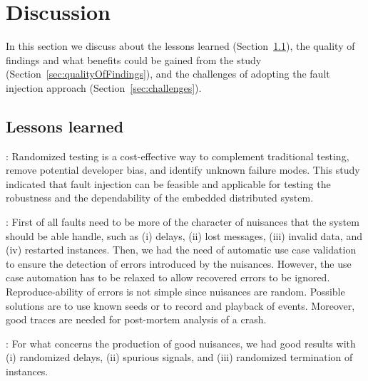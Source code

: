 \section{Discussion}\label{sec:discussion}

In this section we discuss about the %
lessons learned (Section~\ref{sec:lessonslearned}), the quality of findings and what benefits could be gained from the study (Section~\ref{sec:qualityOfFindings}), and the 
challenges of adopting the fault injection approach (Section~\ref{sec:challenges}). %

\subsection{Lessons learned}\label{sec:lessonslearned}

: Randomized testing is a cost-effective way to complement traditional testing, remove potential  developer bias, and identify unknown failure modes. This study indicated that fault injection can be feasible and applicable for testing the robustness and the dependability of the embedded distributed system. %

: First of all faults need to be more of the character of nuisances that the system should be able handle, such as (i) delays, (ii) lost messages, (iii) invalid data, and (iv) restarted instances. Then, we had the need of automatic use case validation to ensure the detection of errors introduced by the nuisances. However, the use case automation has to be relaxed to allow recovered errors to be ignored.
Reproduce-ability of errors is not simple since nuisances are random. Possible solutions are to use known seeds or to record and playback of events. Moreover, good traces are needed for post-mortem analysis of a crash. 

: For what concerns the production of good nuisances, we had good results with (i) randomized delays, (ii) spurious signals, and (iii) randomized termination of instances. 

